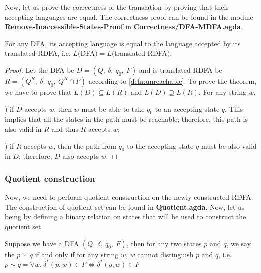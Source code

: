 \par Now, let us prove the correctness of the translation by proving
that their accepting languages are equal. The correctness proof can be
found in the module \textbf{Remove-Inaccessible-States-Proof} in \textbf{Correctness/DFA-MDFA.agda}. 

\begin{thm}
\noindent For any DFA, its accepting language is equal to
the language accepted by its translated RDFA, i.e. \(L(\)DFA\()
= L(\)translated RDFA\()\). 
\end{thm}

\begin{proof}
\noindent Let the DFA be \(D = (Q,\ \delta,\ q_0,\ F)\) and is
translated RDFA be \(R = (Q^R,\ \delta,\ q_0,\ Q^R \cap F)\) according
to \autoref{defn:unreachable}. To prove the theorem, we have to prove
that \(L(D) \subseteq L(R)\) and \(L(D) \supseteq L(R)\). For any
string \(w\), 

\par {}) if \(D\) accepts \(w\), then \(w\) must be able to
take \(q_0\) to an accepting state \(q\). This implies that all the states in
the path must be reachable; therefore, this path is also valid in
\(R\) and thus \(R\) accepts \(w\); 

\par {}) if \(R\) accepts \(w\), then the path from \(q_0\)
to the accepting state \(q\) must be also valid in \(D\); therefore,
\(D\) also accepts \(w\). 
\end{proof}


\subsubsection{Quotient construction}
\par Now, we need to perform quotient construction on the newly
constructed RDFA. The construction of quotient set can be found in
\textbf{Quotient.agda}. Now, let us being by defining a
binary relation on states that will be used to construct the quotient set. 

\begin{defn}
\noindent Suppose we have a DFA \((Q,\ \delta,\ q_0,\ F)\), then for any two states \(p\) and \(q\), we say
the \(p \sim q\) if and only if for any string \(w\),
\(w\) cannot distinguish \(p\) and \(q\), i.e. \(p \sim q = \forall w.\
\delta^*(p,w) \in F \Leftrightarrow \delta^*(q,w) \in F\)
\end{defn}

